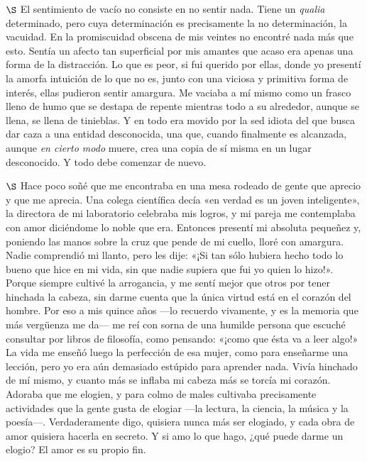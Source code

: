 \documentclass[a4paper, 12pt]{article}
\begin{document}
$\S$ El sentimiento de vacío no consiste en no sentir nada. Tiene un
\textit{qualia} determinado, pero cuya determinación es precisamente la no
determinación, la vacuidad. En la promiscuidad obscena de mis veintes no
encontré nada más que esto. Sentía un afecto tan superficial por mis amantes que
acaso era apenas una forma de la distracción. Lo que es peor, si fui querido por
ellas, donde yo presentí la amorfa intuición de lo que no es, junto con una
viciosa y primitiva forma de interés, ellas pudieron sentir amargura. Me vaciaba
a mí mismo como un frasco lleno de humo que se destapa de repente mientras todo
a su alrededor, aunque se llena, se llena de tinieblas. Y en todo era movido por
la sed idiota del que busca dar caza a una entidad desconocida, una que, cuando
finalmente es alcanzada, aunque \textit{en cierto modo} muere, crea una copia de
sí misma en un lugar desconocido. Y todo debe comenzar de nuevo.

$\S$ Hace poco soñé que me encontraba en una mesa rodeado de gente que aprecio y
que me aprecia. Una colega científica decía «en verdad es un joven inteligente»,
la directora de mi laboratorio celebraba mis logros, y mi pareja me contemplaba
con amor diciéndome lo noble que era. Entonces presentí mi absoluta pequeñez y,
poniendo las manos sobre la cruz que pende de mi cuello, lloré con amargura.
Nadie comprendió mi llanto, pero les dije: «¡Si tan sólo hubiera hecho todo lo
bueno que hice en mi vida, sin que nadie supiera que fui yo quien lo
hizo!». Porque siempre cultivé la arrogancia, y me sentí mejor que
otros por tener hinchada la cabeza, sin darme cuenta que la única virtud está en
el corazón del hombre. Por eso a mis quince años ---lo recuerdo vivamente, y es
la memoria que más vergüenza me da--- me reí con sorna de una humilde persona
que escuché consultar por libros de filosofía, como pensando: «¡como que ésta va
a leer algo!» La vida me enseñó luego la perfección de esa mujer, como para
enseñarme una lección, pero yo era aún demasiado estúpido para aprender nada.
Vivía hinchado de mí mismo, y cuanto más se inflaba mi cabeza más se torcía mi
corazón. Adoraba que me elogien, y para colmo de males cultivaba precisamente
actividades que la gente gusta de elogiar ---la lectura, la ciencia, la música y
la poesía---. Verdaderamente digo, quisiera nunca más ser elogiado, y cada obra
de amor quisiera hacerla en secreto. Y si amo lo que hago, ¿qué puede darme un
elogio? El amor es su propio fin.
\end{document}
